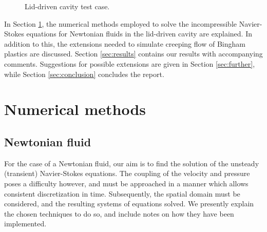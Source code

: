 \documentclass[final,3p,twocolumn]{elsarticle}
\begin{document}
\begin{figure}[htb]
    \centering
    \caption{Lid-driven cavity test case.}
    \label{fig:lidDrivenCavity}
\end{figure}

In Section \ref{sec:numerical}, the numerical methods employed to solve the
incompressible Navier-Stokes equations for Newtonian fluids in the lid-driven
cavity are explained. In addition to this, the extensions needed to simulate
creeping flow of Bingham plastics are discussed. Section \ref{sec:results}
contains our results with accompanying comments. Suggestions for possible
extensions are given in Section \ref{sec:further}, while Section
\ref{sec:conclusion} concludes the report. 

\section{Numerical methods}
\label{sec:numerical}

\subsection{Newtonian fluid}
\label{subsec:newtonian}

For the case of a Newtonian fluid, our aim is to find the solution of the
unsteady (transient) Navier-Stokes equations. The coupling of the velocity and
pressure poses a difficulty however, and must be approached in a manner which
allows consistent discretization in time. Subsequently, the spatial domain must
be considered, and the resulting systems of equations solved.  We presently
explain the chosen techniques to do so, and include notes on how they have been
implemented. 
\end{document}
